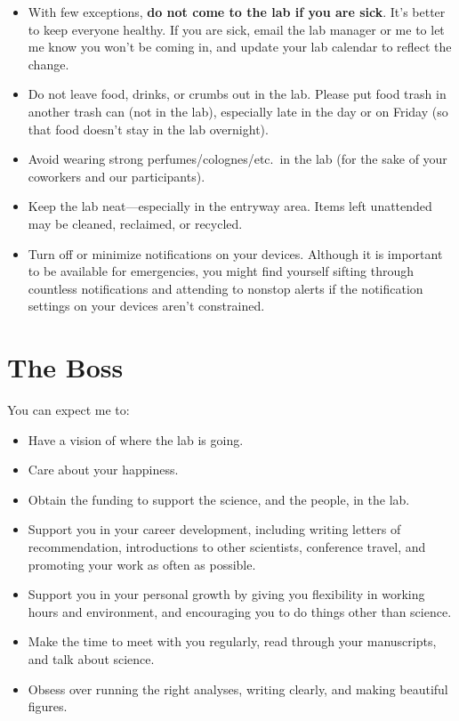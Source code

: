 \documentclass[letterpaper,12pt,oneside]{memoir}
\begin{document}
\begin{itemize}
\item With few exceptions, \textbf{do not come to the lab if you are sick}. It's better to keep everyone healthy. If you are sick, email the lab manager or me to let me know you won't be coming in, and update your lab calendar to reflect the change.
\item Do not leave food, drinks, or crumbs out in the lab. Please put food trash in another trash can (not in the lab), especially late in the day or on Friday (so that food doesn't stay in the lab overnight).
\item Avoid wearing strong perfumes/colognes/etc.\ in the lab (for the sake of your coworkers and our participants).
\item Keep the lab neat---especially in the entryway area. Items left unattended may be cleaned, reclaimed, or recycled.
\item Turn off or minimize notifications on your devices. Although it is important to be available for emergencies, you might find yourself sifting through countless notifications and attending to nonstop alerts if the notification settings on your devices aren't constrained.
\end{itemize}


\section{The Boss}

You can expect me to:

\begin{itemize}
\item Have a vision of where the lab is going.
\item Care about your happiness.
\item Obtain the funding to support the science, and the people, in the lab.
\item Support you in your career development, including writing letters of recommendation, introductions to other scientists, conference travel, and promoting your work as often as possible.
\item Support you in your personal growth by giving you flexibility in working hours and environment, and encouraging you to do things other than science.
\item Make the time to meet with you regularly, read through your manuscripts, and talk about science.
\item Obsess over running the right analyses, writing clearly, and making beautiful figures.
\end{itemize}
\end{document}

